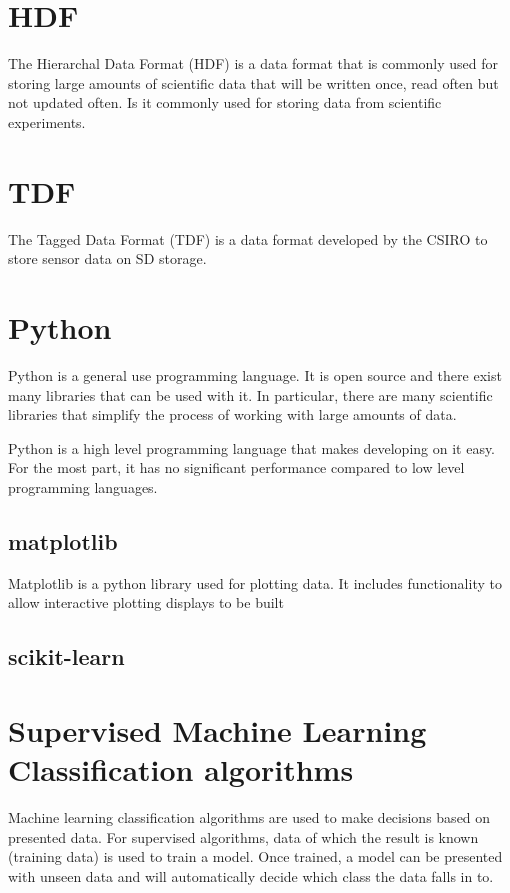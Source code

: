 \section{HDF}
The Hierarchal Data Format (HDF) is a data format that is commonly used for storing large amounts of scientific data that will be written once, read often but not updated often. Is it commonly used for storing data from scientific experiments. 

\section{TDF}
The Tagged Data Format (TDF) is a data format developed by the CSIRO to store sensor data on SD storage.

\section{Python}
Python is a general use programming language. It is open source and there exist many libraries that can be used with it. In particular, there are many scientific libraries that simplify the process of working with large amounts of data. 

Python is a high level programming language that makes developing on it easy. For the most part, it has no significant performance compared to low level programming languages.

\subsection{matplotlib}
Matplotlib is a python library used for plotting data. It includes functionality to allow interactive plotting displays to be built 

\subsection{scikit-learn}

\section{Supervised Machine Learning Classification algorithms}

Machine learning classification algorithms are used to make decisions based on presented data. For supervised algorithms, data of which the result is known (training data) is used to train a model. Once trained, a model can be presented with unseen data and will automatically decide which class the data falls in to. 

